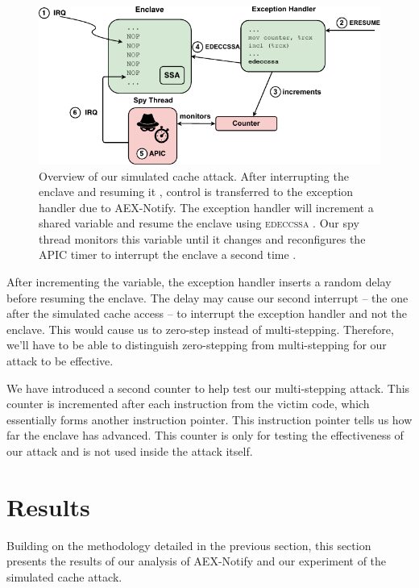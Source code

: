 \documentclass{llncs}
\begin{document}
\begin{figure}[t]
  \includegraphics{images/cache-attack.pdf}
  \caption{Overview of our simulated cache attack.
    After interrupting the enclave  and resuming it ,
    control is transferred to the exception handler due to AEX-Notify.
    The exception handler will increment a shared variable 
    and resume the enclave using \textsc{edeccssa} .
    Our spy thread monitors this variable until it changes and reconfigures
    the APIC timer  to interrupt the enclave a second time .}
\end{figure}

After incrementing the variable, the exception handler inserts a random delay
before resuming the enclave.
The delay may cause our second interrupt -- the one after the simulated cache
access -- to interrupt the exception handler and not the enclave.
This would cause us to zero-step instead of multi-stepping.
Therefore, we'll have to be able to distinguish zero-stepping from
multi-stepping for our attack to be effective.

We have introduced a second counter to help test our multi-stepping attack.
This counter is incremented after each instruction from the victim code,
which essentially forms another instruction pointer.
This instruction pointer tells us how far the enclave has advanced.
This counter is only for testing the effectiveness of our attack
and is not used inside the attack itself.

\section{Results}

Building on the methodology detailed in the previous section, this section presents
the results of our analysis of AEX-Notify and our experiment of the simulated cache attack.
\end{document}
